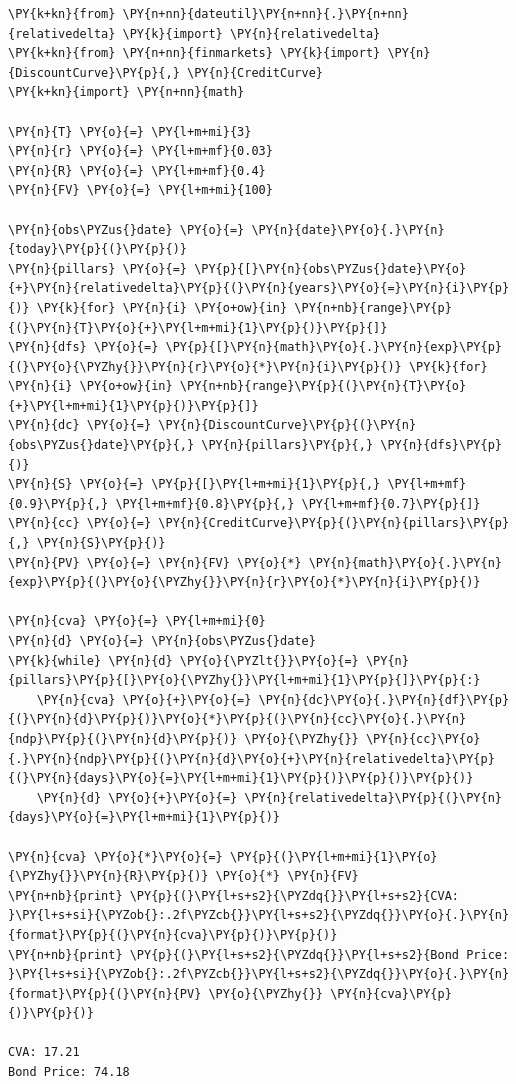 \begin{codebox}
\begin{Verbatim}[commandchars=\\\{\}]
\PY{k+kn}{from} \PY{n+nn}{dateutil}\PY{n+nn}{.}\PY{n+nn}{relativedelta} \PY{k}{import} \PY{n}{relativedelta}
\PY{k+kn}{from} \PY{n+nn}{finmarkets} \PY{k}{import} \PY{n}{DiscountCurve}\PY{p}{,} \PY{n}{CreditCurve}
\PY{k+kn}{import} \PY{n+nn}{math}
		
\PY{n}{T} \PY{o}{=} \PY{l+m+mi}{3} 
\PY{n}{r} \PY{o}{=} \PY{l+m+mf}{0.03}
\PY{n}{R} \PY{o}{=} \PY{l+m+mf}{0.4}
\PY{n}{FV} \PY{o}{=} \PY{l+m+mi}{100}
		
\PY{n}{obs\PYZus{}date} \PY{o}{=} \PY{n}{date}\PY{o}{.}\PY{n}{today}\PY{p}{(}\PY{p}{)}
\PY{n}{pillars} \PY{o}{=} \PY{p}{[}\PY{n}{obs\PYZus{}date}\PY{o}{+}\PY{n}{relativedelta}\PY{p}{(}\PY{n}{years}\PY{o}{=}\PY{n}{i}\PY{p}{)} \PY{k}{for} \PY{n}{i} \PY{o+ow}{in} \PY{n+nb}{range}\PY{p}{(}\PY{n}{T}\PY{o}{+}\PY{l+m+mi}{1}\PY{p}{)}\PY{p}{]}
\PY{n}{dfs} \PY{o}{=} \PY{p}{[}\PY{n}{math}\PY{o}{.}\PY{n}{exp}\PY{p}{(}\PY{o}{\PYZhy{}}\PY{n}{r}\PY{o}{*}\PY{n}{i}\PY{p}{)} \PY{k}{for} \PY{n}{i} \PY{o+ow}{in} \PY{n+nb}{range}\PY{p}{(}\PY{n}{T}\PY{o}{+}\PY{l+m+mi}{1}\PY{p}{)}\PY{p}{]}
\PY{n}{dc} \PY{o}{=} \PY{n}{DiscountCurve}\PY{p}{(}\PY{n}{obs\PYZus{}date}\PY{p}{,} \PY{n}{pillars}\PY{p}{,} \PY{n}{dfs}\PY{p}{)}
\PY{n}{S} \PY{o}{=} \PY{p}{[}\PY{l+m+mi}{1}\PY{p}{,} \PY{l+m+mf}{0.9}\PY{p}{,} \PY{l+m+mf}{0.8}\PY{p}{,} \PY{l+m+mf}{0.7}\PY{p}{]}
\PY{n}{cc} \PY{o}{=} \PY{n}{CreditCurve}\PY{p}{(}\PY{n}{pillars}\PY{p}{,} \PY{n}{S}\PY{p}{)}
\PY{n}{PV} \PY{o}{=} \PY{n}{FV} \PY{o}{*} \PY{n}{math}\PY{o}{.}\PY{n}{exp}\PY{p}{(}\PY{o}{\PYZhy{}}\PY{n}{r}\PY{o}{*}\PY{n}{i}\PY{p}{)}
		
\PY{n}{cva} \PY{o}{=} \PY{l+m+mi}{0}
\PY{n}{d} \PY{o}{=} \PY{n}{obs\PYZus{}date}
\PY{k}{while} \PY{n}{d} \PY{o}{\PYZlt{}}\PY{o}{=} \PY{n}{pillars}\PY{p}{[}\PY{o}{\PYZhy{}}\PY{l+m+mi}{1}\PY{p}{]}\PY{p}{:}
    \PY{n}{cva} \PY{o}{+}\PY{o}{=} \PY{n}{dc}\PY{o}{.}\PY{n}{df}\PY{p}{(}\PY{n}{d}\PY{p}{)}\PY{o}{*}\PY{p}{(}\PY{n}{cc}\PY{o}{.}\PY{n}{ndp}\PY{p}{(}\PY{n}{d}\PY{p}{)} \PY{o}{\PYZhy{}} \PY{n}{cc}\PY{o}{.}\PY{n}{ndp}\PY{p}{(}\PY{n}{d}\PY{o}{+}\PY{n}{relativedelta}\PY{p}{(}\PY{n}{days}\PY{o}{=}\PY{l+m+mi}{1}\PY{p}{)}\PY{p}{)}\PY{p}{)}
    \PY{n}{d} \PY{o}{+}\PY{o}{=} \PY{n}{relativedelta}\PY{p}{(}\PY{n}{days}\PY{o}{=}\PY{l+m+mi}{1}\PY{p}{)}
		
\PY{n}{cva} \PY{o}{*}\PY{o}{=} \PY{p}{(}\PY{l+m+mi}{1}\PY{o}{\PYZhy{}}\PY{n}{R}\PY{p}{)} \PY{o}{*} \PY{n}{FV}
\PY{n+nb}{print} \PY{p}{(}\PY{l+s+s2}{\PYZdq{}}\PY{l+s+s2}{CVA: }\PY{l+s+si}{\PYZob{}:.2f\PYZcb{}}\PY{l+s+s2}{\PYZdq{}}\PY{o}{.}\PY{n}{format}\PY{p}{(}\PY{n}{cva}\PY{p}{)}\PY{p}{)}
\PY{n+nb}{print} \PY{p}{(}\PY{l+s+s2}{\PYZdq{}}\PY{l+s+s2}{Bond Price: }\PY{l+s+si}{\PYZob{}:.2f\PYZcb{}}\PY{l+s+s2}{\PYZdq{}}\PY{o}{.}\PY{n}{format}\PY{p}{(}\PY{n}{PV} \PY{o}{\PYZhy{}} \PY{n}{cva}\PY{p}{)}\PY{p}{)}

CVA: 17.21
Bond Price: 74.18
\end{Verbatim}
\end{codebox}

